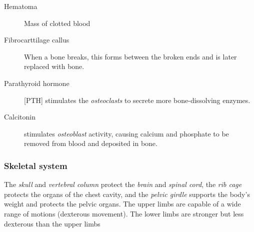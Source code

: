 \documentclass[11pt]{article}
\begin{document}
\begin{description}
\item[{Hematoma}] Mass of clotted blood

\item[{Fibrocarttilage callus}] When a bone breaks, this forms between the
broken ends and is later replaced with bone.

\item[{Parathyroid hormone}] [PTH] stimulates the \emph{osteoclasts} to secrete more
bone-dissolving enzymes.

\item[{Calcitonin}] stimulates \emph{osteoblast} activity, causing calcium and
phosphate to be removed from blood and deposited in bone.
\end{description}

\subsubsection{Skeletal system}
\label{sec:orgf6f87dc}
The \emph{skull} and \emph{vertebral column} protect the \emph{brain} and \emph{spinal cord},
the \emph{rib cage} protects the organs of the chest cavity, and the \emph{pelvic
girdle} supports the body's weight and protects the pelvic organs. The upper
limbs are capable of a wide range of motions (dexterous movement). The lower
limbs are stronger but less dexterous than the upper limbs
\end{document}
